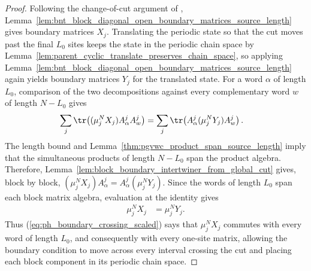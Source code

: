 \begin{proof}
    \leanok
    Following the change-of-cut argument of
    \cite[Theorem~12, proof lines~1276--1289 and
        1454--1456]{PerezGarcia2007Matrix},
    Lemma~\ref{lem:bnt_block_diagonal_open_boundary_matrices_source_length}
    gives boundary matrices $X_j$. Translating the periodic state so that the
    cut moves past the final $L_0$ sites keeps the state in the periodic chain
    space by Lemma~\ref{lem:parent_cyclic_translate_preserves_chain_space}, so
    applying
    Lemma~\ref{lem:bnt_block_diagonal_open_boundary_matrices_source_length}
    again yields boundary matrices $Y_j$ for the translated state. For a word
    $\alpha$ of length $L_0$, comparison of the two decompositions against
    every complementary word $w$ of length $N-L_0$ gives
    \begin{align}
        \sum_j\tr\!\left((\mu_j^NX_j)A^j_\alpha A^j_w\right)
         & =
        \sum_j\tr\!\left(A^j_\alpha(\mu_j^NY_j)A^j_w\right).
        \notag
    \end{align}
    The length bound and
    Lemma~\ref{thm:pgvwc_product_span_source_length} imply that the
    simultaneous products of length $N-L_0$ span the product algebra.
    Therefore,
    Lemma~\ref{lem:block_boundary_intertwiner_from_global_cut} gives, block by
    block,
    $(\mu_j^NX_j)A^j_\alpha = A^j_\alpha(\mu_j^NY_j)$.
    Since the words of length $L_0$ span each block matrix algebra, evaluation
    at the identity gives
    \begin{align}
        \mu_j^NX_j
         & =
        \mu_j^NY_j.
        \label{eq:ph_boundary_crossing_scaled}
    \end{align}
    Thus (\ref{eq:ph_boundary_crossing_scaled}) says that
    $\mu_j^NX_j$ commutes with every word of length $L_0$, and consequently
    with every one-site matrix, allowing the boundary condition to move
    across every interval crossing the cut and placing each block component
    in its periodic chain space.
\end{proof}

